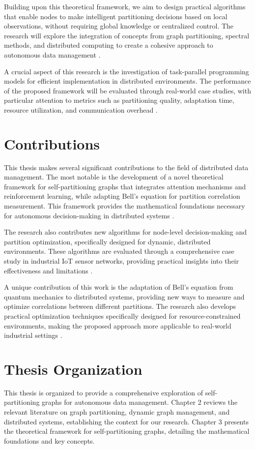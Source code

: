 Building upon this theoretical framework, we aim to design practical algorithms that enable nodes to make intelligent partitioning decisions based on local observations, without requiring global knowledge or centralized control. The research will explore the integration of concepts from graph partitioning, spectral methods, and distributed computing to create a cohesive approach to autonomous data management \cite{spectral2023}.

A crucial aspect of this research is the investigation of task-parallel programming models for efficient implementation in distributed environments. The performance of the proposed framework will be evaluated through real-world case studies, with particular attention to metrics such as partitioning quality, adaptation time, resource utilization, and communication overhead \cite{conference2023}.

\section{Contributions}
This thesis makes several significant contributions to the field of distributed data management. The most notable is the development of a novel theoretical framework for self-partitioning graphs that integrates attention mechanisms and reinforcement learning, while adapting Bell's equation for partition correlation measurement. This framework provides the mathematical foundations necessary for autonomous decision-making in distributed systems \cite{optimization2023b}.

The research also contributes new algorithms for node-level decision-making and partition optimization, specifically designed for dynamic, distributed environments. These algorithms are evaluated through a comprehensive case study in industrial IoT sensor networks, providing practical insights into their effectiveness and limitations \cite{iot2023}.

A unique contribution of this work is the adaptation of Bell's equation from quantum mechanics to distributed systems, providing new ways to measure and optimize correlations between different partitions. The research also develops practical optimization techniques specifically designed for resource-constrained environments, making the proposed approach more applicable to real-world industrial settings \cite{technical2023}.

\section{Thesis Organization}
This thesis is organized to provide a comprehensive exploration of self-partitioning graphs for autonomous data management. Chapter 2 reviews the relevant literature on graph partitioning, dynamic graph management, and distributed systems, establishing the context for our research. Chapter 3 presents the theoretical framework for self-partitioning graphs, detailing the mathematical foundations and key concepts.

